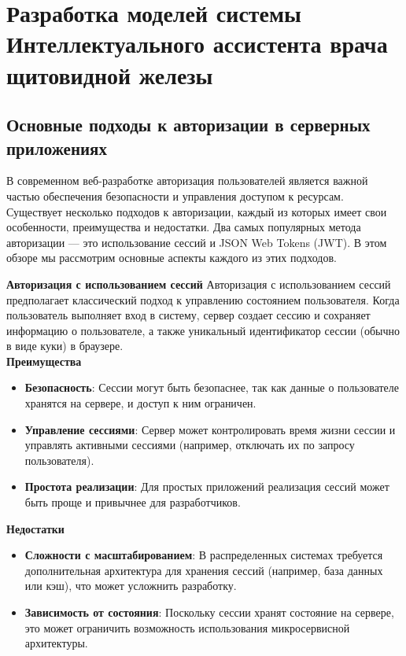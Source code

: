 \chapter{Разработка моделей системы Интеллектуального ассистента врача щитовидной железы}

\section{Основные подходы к авторизации в серверных приложениях}

В современном веб-разработке авторизация пользователей является важной частью обеспечения безопасности и управления доступом к ресурсам\cite{mann2020oauth}. Существует несколько подходов к авторизации, каждый из которых имеет свои особенности, преимущества и недостатки. Два самых популярных метода авторизации — это использование сессий и JSON Web Tokens (JWT). В этом обзоре мы рассмотрим основные аспекты каждого из этих подходов.


\textbf{Авторизация с использованием сессий}
Авторизация с использованием сессий предполагает классический подход к управлению состоянием пользователя\cite{wilson2021session}.
Когда пользователь выполняет вход в систему, сервер создает сессию и сохраняет информацию о пользователе, 
а также уникальный идентификатор сессии (обычно в виде куки) в браузере.\\
\textbf{Преимущества}
\begin{itemize}
    \item \textbf{Безопасность}: Сессии могут быть безопаснее, так как данные о пользователе хранятся на сервере, и доступ к ним ограничен.
    \item \textbf{Управление сессиями}: Сервер может контролировать время жизни сессии и управлять активными сессиями (например, отключать их по запросу пользователя).
    \item \textbf{Простота реализации}: Для простых приложений реализация сессий может быть проще и привычнее для разработчиков.
\end{itemize}

\textbf{Недостатки}
\begin{itemize}
    \item \textbf{Сложности с масштабированием}: В распределенных системах требуется дополнительная архитектура для хранения сессий (например, база данных или кэш), что может усложнить разработку.
    \item \textbf{Зависимость от состояния}: Поскольку сессии хранят состояние на сервере, это может ограничить возможность использования микросервисной архитектуры.
\end{itemize}


